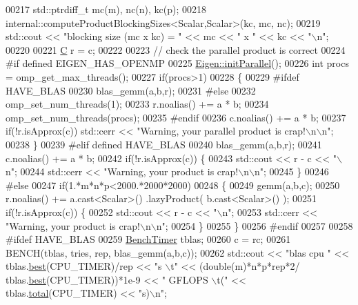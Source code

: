 \begin{DoxyCode}
00217   std::ptrdiff\_t mc(m), nc(n), kc(p);
00218   internal::computeProductBlockingSizes<Scalar,Scalar>(kc, mc, nc);
00219   std::cout << \textcolor{stringliteral}{"blocking size (mc x kc) = "} << mc << \textcolor{stringliteral}{" x "} << kc << \textcolor{stringliteral}{"\(\backslash\)n"};
00220 
00221   \hyperlink{group___core___module}{C} r = c;
00222 
00223   \textcolor{comment}{// check the parallel product is correct}
00224 \textcolor{preprocessor}{  #if defined EIGEN\_HAS\_OPENMP}
00225   \hyperlink{namespace_eigen_a820c0e0460934cc17eb6dacbad54a9f5}{Eigen::initParallel}();
00226   \textcolor{keywordtype}{int} procs = omp\_get\_max\_threads();
00227   \textcolor{keywordflow}{if}(procs>1)
00228   \{
00229 \textcolor{preprocessor}{    #ifdef HAVE\_BLAS}
00230     blas\_gemm(a,b,r);
00231 \textcolor{preprocessor}{    #else}
00232     omp\_set\_num\_threads(1);
00233     r.noalias() += a * b;
00234     omp\_set\_num\_threads(procs);
00235 \textcolor{preprocessor}{    #endif}
00236     c.noalias() += a * b;
00237     \textcolor{keywordflow}{if}(!r.isApprox(c)) std::cerr << \textcolor{stringliteral}{"Warning, your parallel product is crap!\(\backslash\)n\(\backslash\)n"};
00238   \}
00239 \textcolor{preprocessor}{  #elif defined HAVE\_BLAS}
00240     blas\_gemm(a,b,r);
00241     c.noalias() += a * b;
00242     \textcolor{keywordflow}{if}(!r.isApprox(c)) \{
00243       std::cout << r  - c << \textcolor{stringliteral}{"\(\backslash\)n"};
00244       std::cerr << \textcolor{stringliteral}{"Warning, your product is crap!\(\backslash\)n\(\backslash\)n"};
00245     \}
00246 \textcolor{preprocessor}{  #else}
00247     \textcolor{keywordflow}{if}(1.*m*n*p<2000.*2000*2000)
00248     \{
00249       gemm(a,b,c);
00250       r.noalias() += a.cast<Scalar>() .lazyProduct( b.cast<Scalar>() );
00251       \textcolor{keywordflow}{if}(!r.isApprox(c)) \{
00252         std::cout << r - c << \textcolor{stringliteral}{"\(\backslash\)n"};
00253         std::cerr << \textcolor{stringliteral}{"Warning, your product is crap!\(\backslash\)n\(\backslash\)n"};
00254       \}
00255     \}
00256 \textcolor{preprocessor}{  #endif}
00257 
00258 \textcolor{preprocessor}{  #ifdef HAVE\_BLAS}
00259   \hyperlink{class_eigen_1_1_bench_timer}{BenchTimer} tblas;
00260   c = rc;
00261   BENCH(tblas, tries, rep, blas\_gemm(a,b,c));
00262   std::cout << \textcolor{stringliteral}{"blas  cpu         "} << tblas.\hyperlink{class_eigen_1_1_bench_timer_ae8b673b0fa356d3432c7a65c79e8af0e}{best}(CPU\_TIMER)/rep  << \textcolor{stringliteral}{"s  \(\backslash\)t"} << (double(m)*n*p*rep*2/
      tblas.\hyperlink{class_eigen_1_1_bench_timer_ae8b673b0fa356d3432c7a65c79e8af0e}{best}(CPU\_TIMER))*1e-9  <<  \textcolor{stringliteral}{" GFLOPS \(\backslash\)t("} << tblas.\hyperlink{class_eigen_1_1_bench_timer_af341aa613dba2d4a3d167093197e4e7a}{total}(CPU\_TIMER)  << \textcolor{stringliteral}{"s)\(\backslash\)n"};

\end{DoxyCode}
